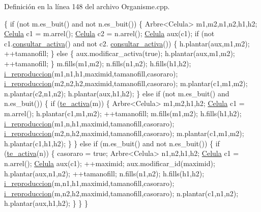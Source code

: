Definición en la línea 148 del archivo Organisme.\-cpp.


\begin{DoxyCode}
\{
    \textcolor{keywordflow}{if} (not m.es\_buit() and not n.es\_buit()) \{
        Arbre<Celula> m1,m2,n1,n2,h1,h2;
        \hyperlink{class_celula}{Celula} c1 = m.arrel();
        \hyperlink{class_celula}{Celula} c2 = n.arrel();
        \hyperlink{class_celula}{Celula} aux(c1);
        \textcolor{keywordflow}{if} (not c1.\hyperlink{class_celula_a750270ff8277447af6cc3a122d585aab}{consultar\_activa}() and not c2.
      \hyperlink{class_celula_a750270ff8277447af6cc3a122d585aab}{consultar\_activa}()) \{
            h.plantar(aux,m1,m2);
            ++tamanofill;
        \}
        \textcolor{keywordflow}{else} \{
            aux.modificar\_activa(\textcolor{keyword}{true});
            h.plantar(aux,m1,m2);
            ++tamanofill;
        \}
        m.fills(m1,m2);
        n.fills(n1,n2);
        h.fills(h1,h2);
        \hyperlink{class_organisme_a3344f2b519e7b3bd296803d5e37ecfc1}{i\_reproduccion}(m1,n1,h1,maximid,tamanofill,casoraro);
        \hyperlink{class_organisme_a3344f2b519e7b3bd296803d5e37ecfc1}{i\_reproduccion}(m2,n2,h2,maximid,tamanofill,casoraro);
        m.plantar(c1,m1,m2);
        n.plantar(c2,n1,n2);
        h.plantar(aux,h1,h2);
    \}
    \textcolor{keywordflow}{else} \textcolor{keywordflow}{if} (not m.es\_buit() and n.es\_buit()) \{
        \textcolor{keywordflow}{if} (\hyperlink{class_organisme_a52d94598bdac2bcf8264f3cc48b7193a}{te\_activa}(m)) \{
            Arbre<Celula> m1,m2,h1,h2;
            \hyperlink{class_celula}{Celula} c1 = m.arrel();
            h.plantar(c1,m1,m2);
            ++tamanofill;
            m.fills(m1,m2);
            h.fills(h1,h2);
            \hyperlink{class_organisme_a3344f2b519e7b3bd296803d5e37ecfc1}{i\_reproduccion}(m1,n,h1,maximid,tamanofill,casoraro);
            \hyperlink{class_organisme_a3344f2b519e7b3bd296803d5e37ecfc1}{i\_reproduccion}(m2,n,h2,maximid,tamanofill,casoraro);
            m.plantar(c1,m1,m2);
            h.plantar(c1,h1,h2);
        \}
    \}
    \textcolor{keywordflow}{else} \textcolor{keywordflow}{if} (m.es\_buit() and not n.es\_buit()) \{
        \textcolor{keywordflow}{if} (\hyperlink{class_organisme_a52d94598bdac2bcf8264f3cc48b7193a}{te\_activa}(n)) \{
            casoraro = \textcolor{keyword}{true};
            Arbre<Celula> n1,n2,h1,h2;
            \hyperlink{class_celula}{Celula} c1 = n.arrel();
            \hyperlink{class_celula}{Celula} aux(c1);
            ++maximid;
            aux.modificar\_id(maximid);
            h.plantar(aux,n1,n2);
            ++tamanofill;
            n.fills(n1,n2);
            h.fills(h1,h2);
            \hyperlink{class_organisme_a3344f2b519e7b3bd296803d5e37ecfc1}{i\_reproduccion}(m,n1,h1,maximid,tamanofill,casoraro);
            \hyperlink{class_organisme_a3344f2b519e7b3bd296803d5e37ecfc1}{i\_reproduccion}(m,n2,h2,maximid,tamanofill,casoraro);
            n.plantar(c1,n1,n2);
            h.plantar(aux,h1,h2);
        \}
    \}
\}
\end{DoxyCode}
